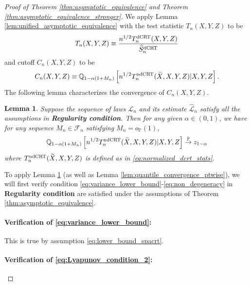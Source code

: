 \documentclass[12pt]{article}
\newtheorem{lemma}{Lemma}
\theoremstyle{definition}
\def\P{\mathbb{P}}
\def\P{\mathbb{P}}
\renewcommand{\P}{\mathbb{P}}							%
\newcommand{\Q}{\mathbb{Q}}								%
\newcommand{\convp}{\overset{\mathbb{P}}{\rightarrow}}             %
\newcommand{\srx}{X}									%
\newcommand{\srz}{Z}									%
\newcommand{\srxk}{\widetilde X}						%
\newcommand{\sry}{Y}									%
\newcommand{\law}{\mathcal L}							%
\newcommand{\lawhat}{\widehat{\mathcal L}}				%
\newcommand{\dCRT}{\textnormal{dCRT}} 					%
\newcommand{\ndCRThat}{\textnormal{ndCRT}}	%
\begin{document}
\begin{proof}[Proof of Theorem \ref{thm:asymptotic_equivalence} and Theorem \ref{thm:asymptotic_equivalence_stronger}]
	We apply Lemma \ref{lem:unified_asymptotic_equivalence} with the test statistic $T_n(\srx,\sry,\srz)$ to be
	\begin{align*}
		T_n(\srx,\sry,\srz)\equiv\frac{n^{1/2}T_n^{\dCRT}(\srx,\sry,\srz)}{\widehat{S}_n^{\dCRT}}
	\end{align*}
	and cutoff $C_n(\srx,\sry,\srz)$ to be 
	\begin{align*}
	  C_n(\srx,\sry,\srz)\equiv\Q_{1-\alpha(1+M_n)}\left[n^{1/2}T_n^{\ndCRThat}(\srxk, \srx, \sry,\srz)|\srx,\sry,\srz\right].
	\end{align*}
	The following lemma characterizes the convergence of $C_n(X,Y,Z)$.
	\begin{lemma}\label{lem:quantile_equivalence}
	  Suppose the sequence of laws $\law_n$ and its estimate $\lawhat_n$ satisfy all the assumptions in \textbf{Regularity condition}. Then for any given $\alpha\in (0,1)$, we have for any sequence $M_n\in\mathcal{F}_n$ satisfying $M_n=o_\P(1)$,
	  \begin{align*}
		\Q_{1-\alpha(1+M_n)}\left[n^{1/2}T_n^{\ndCRThat}(\srxk, \srx, \sry,\srz)|\srx,\sry,\srz\right]\convp z_{1-\alpha}
	  \end{align*}
	  where $T_n^{\ndCRThat}(\srxk,\srx,\sry,\srz)$ is defined as in \eqref{eq:normalized_dcrt_stats}.
	\end{lemma}
  \noindent To apply Lemma \ref{lem:quantile_equivalence} (as well as Lemma \ref{lem:quantile_convergence_ptwise}), we will first verify condition \eqref{eq:variance_lower_bound}-\eqref{eq:non_degeneracy} in \textbf{Regularity condition} are satisfied under the assumptions of Theorem \ref{thm:asymptotic_equivalence}.

  \paragraph{Verification of \eqref{eq:variance_lower_bound}:}

  This is true by assumption \eqref{eq:lower_bound_spacrt}.

  \paragraph{Verification of \eqref{eq:Lyapunov_condition_2}:}


\end{proof}
\end{document}
